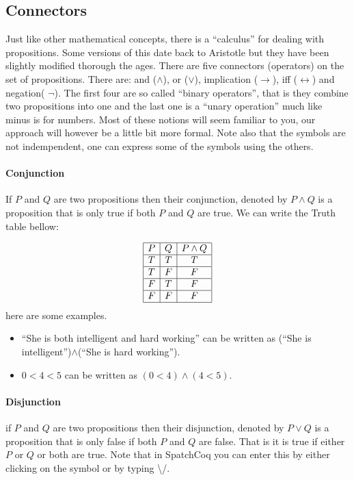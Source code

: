   \subsection{Connectors}
Just like other mathematical concepts, there is a ``calculus'' for dealing with  propositions. Some versions of this date back to Aristotle but they have been slightly modified thorough the ages. There are five connectors (operators) on the set of propositions. There are: and ($\land$), or ($\lor$),  implication ($\rightarrow$),   iff ($\leftrightarrow$) and  negation( $\neg$). The first four are so called ``binary operators'', that is they combine two propositions into one and the last one is a ``unary operation''  much like minus is for numbers. Most of these notions will seem familiar to you, our approach will however be a little bit more formal. Note also that the symbols are not indempendent, one can express some of the symbols using the others.

\paragraph{\bf Conjunction}
If $P$ and $Q$ are two propositions then their conjunction, denoted by $P\land Q$ is a proposition that is only true if both $P$ and $Q$ are true. We can write the Truth table bellow:

$$\begin{array}{|c|c|c|}\hline P & Q & P\land Q \\\hline T & T & T \\\hline T & F & F \\\hline F & T & F \\\hline F & F & F\\ \hline\end{array}$$
here are some examples.

\begin{itemize}
\item ``She is both intelligent and hard working'' can be written as (``She is intelligent'')$\land$(``She is hard working'').
\item $0<4<5$ can be written as $(0<4)\land (4<5)$.
\end{itemize}

\paragraph{\bf Disjunction}
 if $P$ and $Q$ are two propositions then their disjunction, denoted by $P\lor Q$ is a proposition that is only false if both $P$ and $Q$ are false. That is it is true if either $P$ or $Q$ or both are true.  Note that in SpatchCoq you can enter this by either clicking on the symbol or by typing \textbackslash /.
 
